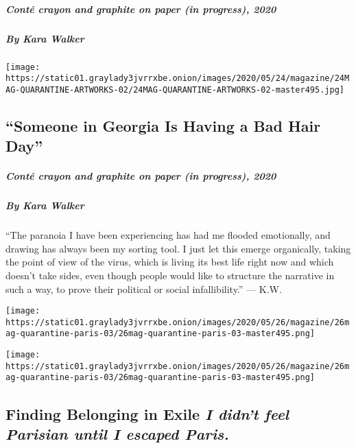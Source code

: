 \hypertarget{contuxe9-crayon-and-graphite-on-paper-in-progress-2020}{%
\subparagraph{Conté crayon and graphite on paper (in progress),
2020}\label{contuxe9-crayon-and-graphite-on-paper-in-progress-2020}}

\hypertarget{by-kara-walker}{%
\subparagraph{By Kara Walker}\label{by-kara-walker}}

\texttt{[image: https://static01.graylady3jvrrxbe.onion/images/2020/05/24/magazine/24MAG-QUARANTINE-ARTWORKS-02/24MAG-QUARANTINE-ARTWORKS-02-master495.jpg]}

\hypertarget{someone-in-georgia-is-having-a-bad-hair-day-1}{%
\subsection{``Someone in Georgia Is Having a Bad Hair
Day''}\label{someone-in-georgia-is-having-a-bad-hair-day-1}}

\hypertarget{contuxe9-crayon-and-graphite-on-paper-in-progress-2020-1}{%
\subparagraph{Conté crayon and graphite on paper (in progress),
2020}\label{contuxe9-crayon-and-graphite-on-paper-in-progress-2020-1}}

\hypertarget{by-kara-walker-1}{%
\subparagraph{By Kara Walker}\label{by-kara-walker-1}}

``The paranoia I have been experiencing has had me flooded emotionally,
and drawing has always been my sorting tool. I just let this emerge
organically, taking the point of view of the virus, which is living its
best life right now and which doesn't take sides, even though people
would like to structure the narrative in such a way, to prove their
political or social infallibility.'' --- K.W.

\texttt{[image: https://static01.graylady3jvrrxbe.onion/images/2020/05/26/magazine/26mag-quarantine-paris-03/26mag-quarantine-paris-03-master495.png]}

\texttt{[image: https://static01.graylady3jvrrxbe.onion/images/2020/05/26/magazine/26mag-quarantine-paris-03/26mag-quarantine-paris-03-master495.png]}

\hypertarget{finding-belonging-in-exile-i-didnt-feel-parisian-until-i-escaped-paris}{%
\subsection{\texorpdfstring{Finding Belonging in Exile \emph{I didn't
feel Parisian until I escaped
Paris.}}{Finding Belonging in Exile I didn't feel Parisian until I escaped Paris.}}\label{finding-belonging-in-exile-i-didnt-feel-parisian-until-i-escaped-paris}}

